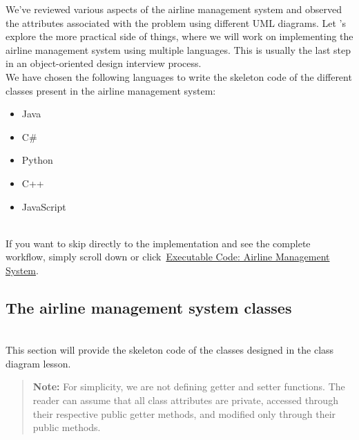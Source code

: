 

We've reviewed various aspects of the airline management system and observed the attributes associated with the problem using different UML diagrams. Let 's explore the more practical side of things, where we will work on implementing the airline management system using multiple languages. This is usually the last step in an object-oriented design interview process.
\\
We have chosen the following languages to write the skeleton code of the different classes present in the airline management system:

\begin{itemize}
\item
\protect{}\label{ZRALeHyL38ZrryY_nxrL6}
Java
\item
\protect{}\label{sZ1gzY1XnAsJ5C4RwoVqt}
C\#
\item
\protect{}\label{2dJx6DgHira96ALmK77iy}
Python
\item
\protect{}\label{JlTPQMu_-KFmNRrQhHInp}
C++
\item
\protect{}\label{9Zgx9WJ9E4Khrt-3Tbhak}
JavaScript
\end{itemize}
\\
If you want to skip directly to the implementation and see the complete workflow, simply scroll down or click~\hyperref[Executable-code-Airline-management-system]{Executable Code: Airline Management System}.

\subsection{The airline management system classes}\label{fxOaz7TAJwEnLE48rpQ8n}
\\
This section will provide the skeleton code of the classes designed in the class diagram lesson.
\begin{quote}
\textbf{Note:} For simplicity, we are not defining getter and setter functions. The reader can assume that all class attributes are private, accessed through their respective public getter methods, and modified only through their public methods.
\end{quote}
